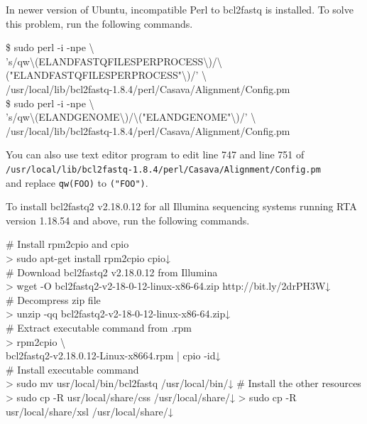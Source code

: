 \documentclass[titlepage,10pt,a4paper,english]{jsbook}
\newenvironment{cmd}{\begin{oframed}\raggedright\ttfamily\footnotesize\setlength{\baselineskip}{1.4em}}{\end{oframed}\vspace{-1em}}
\begin{document}
In newer version of Ubuntu, incompatible Perl to bcl2fastq is installed.
To solve this problem, run the following commands.

\begin{cmd}
\$ sudo perl -i -npe {\textbackslash}\\
's/qw{\textbackslash}(ELAND{\textunderscore}FASTQ{\textunderscore}FILES{\textunderscore}PER{\textunderscore}PROCESS{\textbackslash})/{\textbackslash}("ELAND{\textunderscore}FASTQ{\textunderscore}FILES{\textunderscore}PER{\textunderscore}PROCESS"{\textbackslash})/' {\textbackslash}\\
/usr/local/lib/bcl2fastq-1.8.4/perl/Casava/Alignment/Config.pm\\
\$ sudo perl -i -npe {\textbackslash}\\
's/qw{\textbackslash}(ELAND{\textunderscore}GENOME{\textbackslash})/{\textbackslash}("ELAND{\textunderscore}GENOME"{\textbackslash})/' {\textbackslash}\\
/usr/local/lib/bcl2fastq-1.8.4/perl/Casava/Alignment/Config.pm
\end{cmd}

You can also use text editor program to edit line 747 and line 751 of\\
\texttt{/usr/local/lib/bcl2fastq-1.8.4/perl/Casava/Alignment/Config.pm}\\
and replace \texttt{qw(FOO)} to \texttt{("FOO")}.

To install bcl2fastq2 v2.18.0.12 for all Illumina sequencing systems running RTA version 1.18.54 and above, run the following commands.

\begin{cmd}
\# Install rpm2cpio and cpio\\
{\textgreater} sudo apt-get install rpm2cpio cpio↓\\
\# Download bcl2fastq2 v2.18.0.12 from Illumina\\
{\textgreater} wget -O bcl2fastq2-v2-18-0-12-linux-x86-64.zip http://bit.ly/2drPH3W↓\\
\# Decompress zip file\\
{\textgreater} unzip -qq bcl2fastq2-v2-18-0-12-linux-x86-64.zip↓\\
\# Extract executable command from .rpm\\
{\textgreater} rpm2cpio {\textbackslash}\\
bcl2fastq2-v2.18.0.12-Linux-x86{\textunderscore}64.rpm | cpio -id↓\\
\# Install executable command\\
{\textgreater} sudo mv usr/local/bin/bcl2fastq /usr/local/bin/↓
\# Install the other resources\\
{\textgreater} sudo cp -R usr/local/share/css /usr/local/share/↓
{\textgreater} sudo cp -R usr/local/share/xsl /usr/local/share/↓
\end{cmd}
\end{document}
